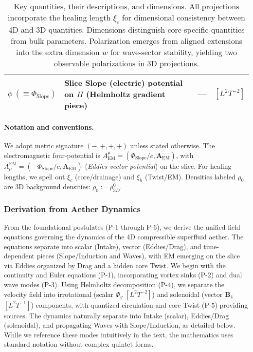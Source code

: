 \begin{table}[H]
\begin{tabularx}{\textwidth}{|l|Y|l|l|}
\hline
$\phi\ (\equiv \Phi_{\text{Slope}})$ & Slice Slope (electric) potential on $\Pi$ (Helmholtz gradient piece) & --- & $[L^2 T^{-2}]$ \\
\hline
\end{tabularx}
\caption{Key quantities, their descriptions, and dimensions. All projections incorporate the healing length $\xi_c$ for dimensional consistency between 4D and 3D quantities. Dimensions distinguish core-specific quantities from bulk parameters. Polarization emerges from aligned extensions into the extra dimension $w$ for wave-sector stability, yielding two observable polarizations in 3D projections.}
\label{tab:notation}
\end{table}
\paragraph{Notation and conventions.}
We adopt metric signature $(-,+,+,+)$ unless stated otherwise.
The electromagnetic four-potential is $A^\mu_{\text{EM}}=(\Phi_{\text{Slope}}/c,\mathbf A_{\text{EM}})$, with $A_{\mu}^{\text{EM}} = (-\Phi_{\text{Slope}}/c,\mathbf A_{\text{EM}})$ (\emph{Eddies vector potential}) on the slice. For healing lengths, we spell out $\xi_c$ (core/drainage) and $\xi_h$ (Twist/EM). Densities labeled $\rho_0$ are 3D background densities: $\rho_0 := \rho_{3D}^0$.

\subsubsection{Derivation from Aether Dynamics}

From the foundational postulates (P-1 through P-6), we derive the unified field equations governing the dynamics of the 4D compressible superfluid aether. The equations separate into scalar (Intake), vector (Eddies/Drag), and time-dependent pieces (Slope/Induction and Waves), with EM emerging on the slice via Eddies organized by Drag and a hidden core Twist. We begin with the continuity and Euler equations (P-1), incorporating vortex sinks (P-2) and dual wave modes (P-3). Using Helmholtz decomposition (P-4), we separate the velocity field into irrotational (scalar $\Phi_g$ $[L^2 T^{-2}]$) and solenoidal (vector $\mathbf{B}_4$ $[L^2 T^{-1}]$) components, with quantized circulation and core Twist (P-5) providing sources. The dynamics naturally separate into Intake (scalar), Eddies/Drag (solenoidal), and propagating Waves with Slope/Induction, as detailed below. While we reference these modes intuitively in the text, the mathematics uses standard notation without complex quintet forms.

